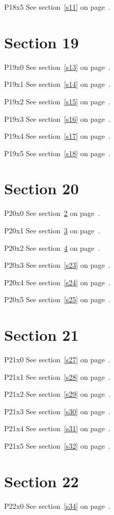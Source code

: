 P18x5 \w\w\w\w\w\w See section~\ref{s11} on page~\pageref{s19}.

\section{Section 19}\label{s19}
P19x0 \w\w\w\w\w\w See section~\ref{s13} on page~\pageref{s17}.

P19x1 \w\w\w\w\w\w See section~\ref{s14} on page~\pageref{s18}.

P19x2 \w\w\w\w\w\w See section~\ref{s15} on page~\pageref{s19}.

P19x3 \w\w\w\w\w\w See section~\ref{s16} on page~\pageref{s20}.

P19x4 \w\w\w\w\w\w See section~\ref{s17} on page~\pageref{s21}.

P19x5 \w\w\w\w\w\w See section~\ref{s18} on page~\pageref{s22}.

\section{Section 20}\label{s20}
P20x0 \w\w\w\w\w\w See section~\ref{s20} on page~\pageref{s20}.

P20x1 \w\w\w\w\w\w See section~\ref{s21} on page~\pageref{s21}.

P20x2 \w\w\w\w\w\w See section~\ref{s22} on page~\pageref{s22}.

P20x3 \w\w\w\w\w\w See section~\ref{s23} on page~\pageref{s23}.

P20x4 \w\w\w\w\w\w See section~\ref{s24} on page~\pageref{s24}.

P20x5 \w\w\w\w\w\w See section~\ref{s25} on page~\pageref{s25}.

\section{Section 21}\label{s21}
P21x0 \w\w\w\w\w\w See section~\ref{s27} on page~\pageref{s23}.

P21x1 \w\w\w\w\w\w See section~\ref{s28} on page~\pageref{s24}.

P21x2 \w\w\w\w\w\w See section~\ref{s29} on page~\pageref{s25}.

P21x3 \w\w\w\w\w\w See section~\ref{s30} on page~\pageref{s26}.

P21x4 \w\w\w\w\w\w See section~\ref{s31} on page~\pageref{s27}.

P21x5 \w\w\w\w\w\w See section~\ref{s32} on page~\pageref{s28}.

\section{Section 22}\label{s22}
P22x0 \w\w\w\w\w\w See section~\ref{s34} on page~\pageref{s26}.


